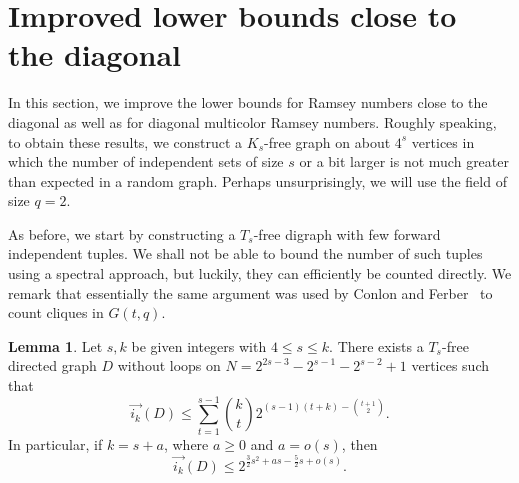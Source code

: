 \documentclass{article}
\theoremstyle{plain}
\newtheorem{lemma}[theorem]{Lemma}
\theoremstyle{definition}
\newtheorem{lemma}{Lemma}
\newcommand{\fwi}[1]{\overrightarrow{i_{#1}}}
\begin{document}
\section{Improved lower bounds close to the diagonal} \label{sec:close}
In this section, we improve the lower bounds for Ramsey numbers close to the diagonal as well as for diagonal multicolor Ramsey numbers. Roughly speaking, to obtain these results, we construct a $K_s$-free graph on about $4^s$ vertices in which the number of independent sets of size $s$ or a bit larger is not much greater than expected in a random graph. Perhaps unsurprisingly, we will use the field of size $q = 2$. 

As before, we start by constructing a $T_s$-free digraph with few forward independent tuples. We shall not be able to bound the number of such tuples using a spectral approach, but luckily, they can efficiently be counted directly. We remark that essentially the same argument was used by Conlon and Ferber~\cite{conlon-ferber} to count cliques in $G(t, q)$.
\begin{lemma} \label{lem:F2-fw-indep-sets}
    Let $s, k$ be given integers with $4 \le s \le k$. There exists a $T_s$-free directed graph $D$ without loops on $N = 2^{2s-3} - 2^{s-1} - 2^{s-2} + 1$ vertices such that 
    \[ \fwi{k}(D) \le \sum_{t=1}^{s-1} \binom{k}{t} 2^{(s-1)(t+k) - \binom{t+1}{2}}. \]
    In particular, if $k = s+a$, where $a \ge 0$ and $a = o(s)$, then
    \[ \fwi{k}(D) \le 2^{\frac{3}{2}s^2 + as - \frac{5}{2}s + o(s)}. \]
\end{lemma}
\end{document}
